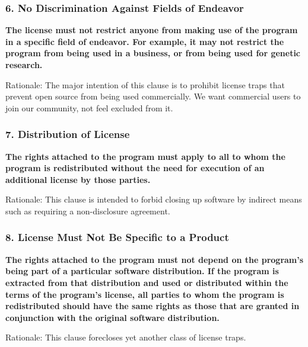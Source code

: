 
\begin{frame}
\frametitle{6. No Discrimination Against Fields of Endeavor}

{\bf 
The license must not restrict anyone from making use of the program in
a specific field of endeavor. For example, it may not restrict the
program from being used in a business, or from being used for genetic
research.} 

\vspace{.2cm}
Rationale: The major intention of this clause is to prohibit license
traps that prevent open source from being used commercially. We want
commercial users to join our community, not feel excluded from it.

\end{frame}


\begin{frame}
\frametitle{7. Distribution of License}

{\bf
The rights attached to the program must apply to all to whom the
program is redistributed without the need for execution of an
additional license by those parties.}

\vspace{.2cm}
Rationale: This clause is intended to forbid closing up software by
indirect means such as requiring a non-disclosure agreement.

\end{frame}


\begin{frame}
\frametitle{8. License Must Not Be Specific to a Product}

{\bf
The rights attached to the program must not depend on the program's
being part of a particular software distribution. If the program is
extracted from that distribution and used or distributed within the
terms of the program's license, all parties to whom the program is
redistributed should have the same rights as those that are granted in
conjunction with the original software distribution.}

\vspace{.2cm}
Rationale: This clause forecloses yet another class of license traps.

\end{frame}

